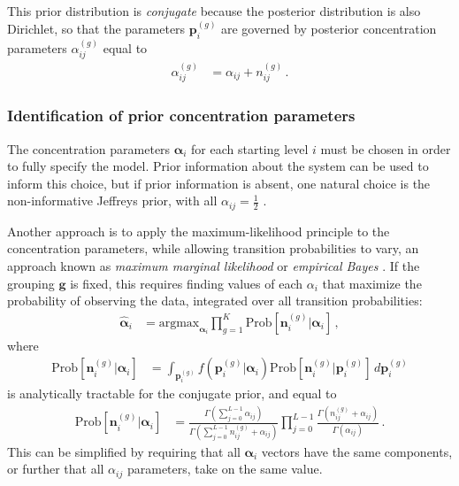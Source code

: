 \documentclass[12pt]{article}
\newcommand{\bg}{\mathbf{g}}
\newcommand{\bp}{\mathbf{p}}
\newcommand{\balpha}{\boldsymbol{\alpha}}
\newcommand{\bn}{\mathbf{n}}
\newcommand{\Prob}{\mathrm{Prob}}
\newcommand{\argmax}{\mathrm{argmax}}
\begin{document}
This prior distribution is \emph{conjugate} because the posterior distribution is also Dirichlet, so that the parameters $\bp_i^{(g)}$ are governed by posterior concentration parameters $\alpha_{ij}^{(g)}$ equal to
\begin{align}
	\alpha_{ij}^{(g)} &= \alpha_{ij} + n_{ij}^{(g)} \, .
\end{align}

\subsubsection{Identification of prior concentration parameters}
\label{model-conc-priors}

The concentration parameters $\balpha_i$ for each starting level $i$ must be chosen in order to fully specify the model. Prior information about the system can be used to inform this choice, but if prior information is absent, one natural choice is the non-informative Jeffreys prior, with all $\alpha_{ij} = \frac{1}{2}$ \cite{jeffreys1946}.

Another approach is to apply the maximum-likelihood principle to the concentration parameters, while allowing transition probabilities to vary, an approach known as \emph{maximum marginal likelihood} or \emph{empirical Bayes} \cite{robbins1956}. If the grouping $\bg$ is fixed, this requires finding values of each $\alpha_{i}$ that maximize the probability of observing the data, integrated over all transition probabilities:
\begin{align}
	\hat{\balpha}_i &= \argmax_{\balpha_i} \prod_{g=1}^K \Prob \left[ \bn_i^{(g)} | \balpha_i \right] \, ,
\end{align}
where
\begin{align}
	\Prob \left[ \bn_i^{(g)} | \balpha_i \right] &= \int_{\bp_i^{(g)}} f(\bp_i^{(g)} | \balpha_i) \Prob\left[ \bn_i^{(g)} | \bp_i^{(g)} \right] \, d\bp_i^{(g)}
\end{align}
is analytically tractable for the conjugate prior, and equal to
\begin{align}
	\label{eq:marginal-row}
	\Prob \left[ \bn_i^{(g)} | \balpha_i \right] &=
	\frac{
		\Gamma \left( \sum_{j=0}^{L - 1} \alpha_{ij} \right)
	}{
		\Gamma \left( \sum_{j=0}^{L - 1} n_{ij}^{(g)} + \alpha_{ij} \right)
	}
	\prod_{j=0}^{L-1}
	\frac{
		\Gamma \left( n_{ij}^{(g)} + \alpha_{ij} \right)
	}{
		\Gamma \left( \alpha_{ij} \right)
	} \, .
\end{align}
This can be simplified by requiring that all $\balpha_i$ vectors have the same components, or further that all $\alpha_{ij}$ parameters, take on the same value.
\end{document}
